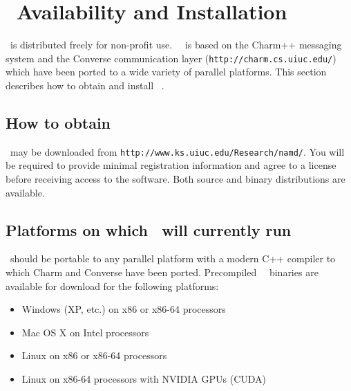 
\section{\NAMD\ Availability and Installation}
\label{section:avail}

\NAMD\ is distributed freely for non-profit use.
\NAMD\ \NAMDVER\ is based on the Charm++ messaging system and the
Converse communication layer ({\tt http://charm.cs.uiuc.edu/})
which have been ported to a wide variety of parallel platforms.
This section describes how to obtain and install \NAMD\ \NAMDVER.

\subsection{How to obtain \NAMD}

\NAMD\ may be downloaded from {\tt http://www.ks.uiuc.edu/Research/namd/}.
You will be required to provide minimal registration information and
agree to a license before receiving access to the software.
Both source and binary distributions are available.

\subsection{Platforms on which \NAMD\ will currently run}
\NAMD\ should be portable to any parallel platform with a
modern C++ compiler to which Charm and Converse have been ported.
Precompiled \NAMD\ \NAMDVER\ binaries are available for
download for the following platforms:  

\begin{itemize}
\item Windows (XP, etc.) on x86 or x86-64 processors
\item Mac OS X on Intel processors
\item Linux on x86 or x86-64 processors
\item Linux on x86-64 processors with NVIDIA GPUs (CUDA)
\end{itemize}

